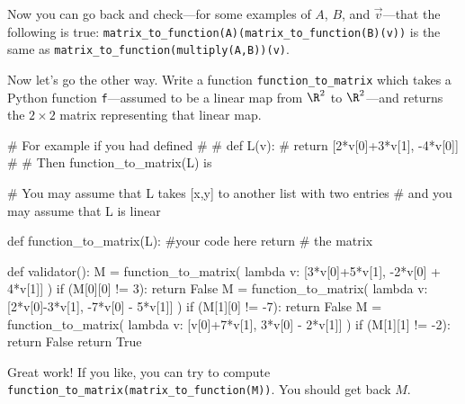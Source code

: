 \documentclass{ximera}
\begin{document}
\begin{exercise}
Now you can go back and check---for some examples of $A$, $B$, and $\vec{v}$---that the following is true:
\verb|matrix_to_function(A)(matrix_to_function(B)(v))| is the same as \verb|matrix_to_function(multiply(A,B))(v)|.

\begin{solution}
  Now let's go the other way.  Write a function
  \verb|function_to_matrix| which takes a Python function
  \verb|f|---assumed to be a linear map from $\R^2$ to $\R^2$---and
  returns the $2 \times 2$ matrix representing that linear map.

\begin{python}
# For example if you had defined
# 
# def L(v):
#   return [2*v[0]+3*v[1], -4*v[0]]
#
# Then function_to_matrix(L) is 
		
# You may assume that L takes [x,y] to another list with two entries
# and you may assume that L is linear

def function_to_matrix(L):
  #your code here
  return # the matrix

def validator():
  M = function_to_matrix( lambda v: [3*v[0]+5*v[1], -2*v[0] + 4*v[1]] )
  if (M[0][0] != 3):
    return False
  M = function_to_matrix( lambda v: [2*v[0]-3*v[1], -7*v[0] - 5*v[1]] )
  if (M[1][0] != -7):
    return False
  M = function_to_matrix( lambda v: [v[0]+7*v[1], 3*v[0] - 2*v[1]] )
  if (M[1][1] != -2):
    return False
  return True
\end{python}
\end{solution}

Great work!  If you like, you can try to compute \verb|function_to_matrix(matrix_to_function(M))|.  You should get back $M$.
\end{exercise}
\end{document}
